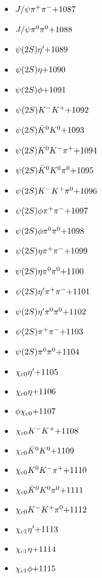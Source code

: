\begin{multicols}{3}
\begin{itemize}
 \item $ J/\psi \pi^{+} \pi^{-} \hfill{+1087}$
 \item $ J/\psi \pi^{0} \pi^{0} \hfill{+1088}$
 \item $ \psi(2S) {\eta^{\prime}} \hfill{+1089}$
 \item $ \psi(2S) \eta \hfill{+1090}$
 \item $ \psi(2S) \phi \hfill{+1091}$
 \item $ \psi(2S) K^{-} K^{+} \hfill{+1092}$
 \item $ \psi(2S) \bar{K}^{0} K^{0} \hfill{+1093}$
 \item $ \psi(2S) K^{0} K^{-} \pi^{+} \hfill{+1094}$
 \item $ \psi(2S) \bar{K}^{0} K^{0} \pi^{0} \hfill{+1095}$
 \item $ \psi(2S) K^{-} K^{+} \pi^{0} \hfill{+1096}$
 \item $ \psi(2S) \phi \pi^{+} \pi^{-} \hfill{+1097}$
 \item $ \psi(2S) \phi \pi^{0} \pi^{0} \hfill{+1098}$
 \item $ \psi(2S) \eta \pi^{+} \pi^{-} \hfill{+1099}$
 \item $ \psi(2S) \eta \pi^{0} \pi^{0} \hfill{+1100}$
 \item $ \psi(2S) {\eta^{\prime}} \pi^{+} \pi^{-} \hfill{+1101}$
 \item $ \psi(2S) {\eta^{\prime}} \pi^{0} \pi^{0} \hfill{+1102}$
 \item $ \psi(2S) \pi^{+} \pi^{-} \hfill{+1103}$
 \item $ \psi(2S) \pi^{0} \pi^{0} \hfill{+1104}$
 \item $ \chi_{c0} {\eta^{\prime}} \hfill{+1105}$
 \item $ \chi_{c0} \eta \hfill{+1106}$
 \item $ \phi \chi_{c0} \hfill{+1107}$
 \item $ \chi_{c0} K^{-} K^{+} \hfill{+1108}$
 \item $ \chi_{c0} \bar{K}^{0} K^{0} \hfill{+1109}$
 \item $ \chi_{c0} K^{0} K^{-} \pi^{+} \hfill{+1110}$
 \item $ \chi_{c0} \bar{K}^{0} K^{0} \pi^{0} \hfill{+1111}$
 \item $ \chi_{c0} K^{-} K^{+} \pi^{0} \hfill{+1112}$
 \item $ \chi_{c1} {\eta^{\prime}} \hfill{+1113}$
 \item $ \chi_{c1} \eta \hfill{+1114}$
 \item $ \chi_{c1} \phi \hfill{+1115}$

\end{itemize}
\end{multicols}
